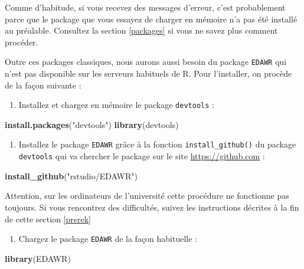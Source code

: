 \documentclass[
  a4paper,
]{article}
\newenvironment{Shaded}{\begin{snugshade}}{\end{snugshade}}
\newcommand{\KeywordTok}[1]{\textcolor[rgb]{0.12,0.11,0.11}{\textbf{#1}}}
\newcommand{\NormalTok}[1]{\textcolor[rgb]{0.12,0.11,0.11}{#1}}
\newcommand{\StringTok}[1]{\textcolor[rgb]{0.75,0.01,0.01}{#1}}
\providecommand{\tightlist}{%
  \setlength{\itemsep}{0pt}\setlength{\parskip}{0pt}}
\begin{document}
Comme d'habitude, si vous recevez des messages d'erreur, c'est probablement parce que le package que vous essayez de charger en mémoire n'a pas été installé au préalable. Consultez la section \ref{packages} si vous ne savez plus comment procéder.

Outre ces packages classiques, nous aurons aussi besoin du package \texttt{EDAWR} qui n'est pas disponible sur les serveurs habituels de R. Pour l'installer, on procède de la façon suivante :

\begin{enumerate}
\def\labelenumi{\arabic{enumi}.}
\tightlist
\item
  Installez et chargez en mémoire le package \texttt{devtools} :
\end{enumerate}

\begin{Shaded}
\begin{Highlighting}[]
\KeywordTok{install.packages}\NormalTok{(}\StringTok{"devtools"}\NormalTok{)}
\KeywordTok{library}\NormalTok{(devtools)}
\end{Highlighting}
\end{Shaded}

\begin{enumerate}
\def\labelenumi{\arabic{enumi}.}
\setcounter{enumi}{1}
\tightlist
\item
  Installez le package \texttt{EDAWR} grâce à la fonction \texttt{install\_github()} du package \texttt{devtools} qui va chercher le package sur le site \url{https://github.com} :
\end{enumerate}

\begin{Shaded}
\begin{Highlighting}[]
\KeywordTok{install_github}\NormalTok{(}\StringTok{"rstudio/EDAWR"}\NormalTok{)}
\end{Highlighting}
\end{Shaded}

Attention, sur les ordinateurs de l'université cette procédure ne fonctionne pas toujours. Si vous rencontrez des difficultés, suivez les instructions décrites à la fin de cette section \ref{prerek}

\begin{enumerate}
\def\labelenumi{\arabic{enumi}.}
\setcounter{enumi}{2}
\tightlist
\item
  Chargez le package \texttt{EDAWR} de la façon habituelle :
\end{enumerate}

\begin{Shaded}
\begin{Highlighting}[]
\KeywordTok{library}\NormalTok{(EDAWR)}
\end{Highlighting}
\end{Shaded}
\end{document}
